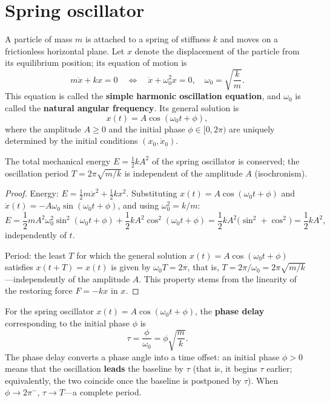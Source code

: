 \section{Spring oscillator}

\begin{definition}\label{def:spring_oscillator}
A particle of mass $m$ is attached to a spring of stiffness $k$ and moves on a frictionless horizontal plane. Let $x$ denote the displacement of the particle from its equilibrium position; its equation of motion is
\[
m\ddot{x} + kx = 0 \quad \Longleftrightarrow \quad \ddot{x} + \omega_0^2 x = 0, \quad \omega_0 = \sqrt{\frac{k}{m}}.
\]
This equation is called the \textbf{simple harmonic oscillation equation}, and $\omega_0$ is called the \textbf{natural angular frequency}. Its general solution is
\[
x(t) = A\cos(\omega_0 t + \phi),
\]
where the amplitude $A \ge 0$ and the initial phase $\phi \in [0, 2\pi)$ are uniquely determined by the initial conditions $(x_0, \dot{x}_0)$.
\end{definition}

\begin{proposition}\label{prop:spring_energy_period}
The total mechanical energy $E = \frac{1}{2}kA^2$ of the spring oscillator is conserved; the oscillation period $T = 2\pi\sqrt{m/k}$ is independent of the amplitude $A$ (isochronism).
\end{proposition}

\begin{proof}
Energy: $E = \frac{1}{2}m\dot x^2 + \frac{1}{2}kx^2$. Substituting $x(t) = A\cos(\omega_0 t + \phi)$ and $\dot x(t) = -A\omega_0\sin(\omega_0 t + \phi)$, and using $\omega_0^2 = k/m$:
\[
E = \frac{1}{2}mA^2\omega_0^2\sin^2(\omega_0 t+\phi) + \frac{1}{2}kA^2\cos^2(\omega_0 t+\phi) = \frac{1}{2}kA^2\big(\sin^2 + \cos^2\big) = \frac{1}{2}kA^2,
\]
independently of $t$.

Period: the least $T$ for which the general solution $x(t) = A\cos(\omega_0 t + \phi)$ satisfies $x(t+T) = x(t)$ is given by $\omega_0 T = 2\pi$, that is, $T = 2\pi/\omega_0 = 2\pi\sqrt{m/k}$---independently of the amplitude $A$. This property stems from the linearity of the restoring force $F = -kx$ in $x$.
\end{proof}

\begin{definition}\label{def:spring_phase_delay}
For the spring oscillator $x(t) = A\cos(\omega_0 t + \phi)$, the \textbf{phase delay} corresponding to the initial phase $\phi$ is
\[
\tau = \frac{\phi}{\omega_0} = \phi \sqrt{\frac{m}{k}}.
\]
The phase delay converts a phase angle into a time offset: an initial phase $\phi>0$ means that the oscillation \textbf{leads} the baseline by $\tau$ (that is, it begins $\tau$ earlier; equivalently, the two coincide once the baseline is postponed by $\tau$). When $\phi \to 2\pi^-$, $\tau \to T$---a complete period.
\end{definition}

